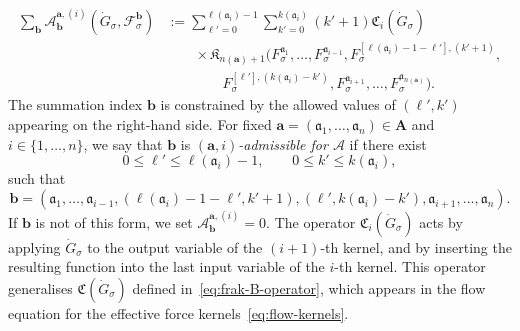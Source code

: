 \documentclass{article}
\numberwithin{equation}{section}
\newcommand{\assign}{:=}
\theoremstyle{plain}
\theoremstyle{definition}
\begin{document}
\begin{equation}
  \begin{aligned}
    \sum_{\boldsymbol{b}} \mathcal{A}^{\boldsymbol{a}, (i)}_{\boldsymbol{b}}
    (\dot{G}_{\sigma}, \mathcal{F}^{\boldsymbol{b}}_{\sigma})
    & \assign
    \sum_{\ell' = 0}^{\ell (\mathfrak{a}_i) - 1}
    \sum^{k (\mathfrak{a}_i)}_{k' = 0} (k' + 1)
    \mathfrak{C}_i (\dot{G}_{\sigma})\\
    &\qquad \times \mathfrak{K}_{n(\boldsymbol{a}) + 1}
    (F_{\sigma}^{\mathfrak{a}_1}, \ldots,
    F_{\sigma}^{\mathfrak{a}_{i - 1}},
    F_{\sigma}^{[\ell (\mathfrak{a}_i) - 1 - \ell'], (k' + 1)},\\
    &\qquad\qquad
    F_{\sigma}^{[\ell'], (k (\mathfrak{a}_i) - k')},
    F_{\sigma}^{\mathfrak{a}_{i + 1}}, \ldots,
    F_{\sigma}^{\mathfrak{a}_{n(\boldsymbol{a})}}) .
  \end{aligned} \label{eq:specific-operator-A}
\end{equation}
The summation index $\boldsymbol{b}$ is constrained by the allowed values of
$(\ell', k')$ appearing on the right-hand side. 
For fixed $\boldsymbol a = (\mathfrak a_1,\ldots,\mathfrak a_n)
\in \boldsymbol A$ and $i \in \{1,\ldots,n\}$, we say that
$\boldsymbol b$ is \emph{$(\boldsymbol a,i)$-admissible for
	$\mathcal A$} if there exist
\[
0 \leqslant \ell' \leqslant \ell(\mathfrak a_i)-1,
\qquad
0 \leqslant k' \leqslant k(\mathfrak a_i),
\]
such that
\[
\boldsymbol b =
(\mathfrak a_1,\ldots,\mathfrak a_{i-1},
(\ell(\mathfrak a_i)-1-\ell',k'+1),
(\ell',k(\mathfrak a_i)-k'),
\mathfrak a_{i+1},\ldots,\mathfrak a_n).
\]
If $\boldsymbol b$ is not of this form, we set
$\mathcal A^{\boldsymbol a,(i)}_{\boldsymbol b}=0$.
The operator
$\mathfrak{C}_i (\dot{G}_{\sigma})$ acts by applying
$\dot{G}_{\sigma}$ to the output variable of the $(i + 1)$-th kernel, and by
inserting the resulting function into the last input variable of the $i$-th
kernel. This operator generalises $\mathfrak{C}
(\dot{G}_{\sigma})$ defined in~\eqref{eq:frak-B-operator}, which appears in
the flow equation for the effective force kernels~\eqref{eq:flow-kernels}.
\end{document}
